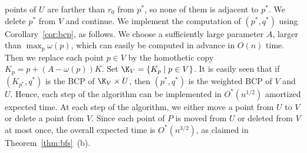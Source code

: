 points of $U$ are farther than $r_0$ from $p^*$, so none of them is adjacent to $p^*$.
We delete $p^*$ from $V$ and continue.
%
We implement the computation of $(p^*,q^*)$  using Corollary~\ref{cor:bcp}, as follows.
We choose a sufficiently large parameter $A$, larger than $\max_p \omega(p)$, which can easily be 
computed in advance in $O(n)$ time. Then we replace each point $p\in V$ by the homothetic copy 
$K_p = p + (A-\omega(p))K$. Set $\K_V = \{ K_p \mid p \in V\}$. It is easily seen that if 
$(K_{p^*}, q^*)$ is the BCP of $\K_V \times U$, then $(p^*,q^*)$ is the weighted BCP of 
$V$ and $U$. Hence, each step of the
algorithm can be implemented in $O^*(n^{1/2})$ amortized expected time. 
%
At each step of the algorithm, we either move a point from $U$ to $V$ or delete a point from $V$.
Since each point of $P$ is moved from $U$ or deleted from $V$ at most once, the overall 
expected time is $O^*(n^{3/2})$, as claimed in Theorem~\ref{thm:bfs}~(b).
\fi
%
%
